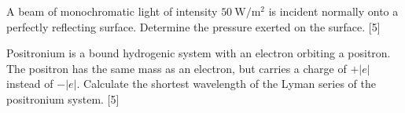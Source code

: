 \begin{problem}
    \begin{subproblem}
        A beam of monochromatic light of intensity $\qty{50}{\W\per\square\m}$ is incident normally onto a perfectly reflecting surface. Determine the pressure exerted on the surface.
    \hfill{[5]}\end{subproblem}
    \begin{subproblem}
        Positronium is a bound hydrogenic system with an electron orbiting a positron. The positron has the same mass as an electron, but carries a charge of $+|e|$ instead of $-|e| .$ Calculate the shortest wavelength of the Lyman series of the positronium system.
    \hfill{[5]}\end{subproblem}
\end{problem}

